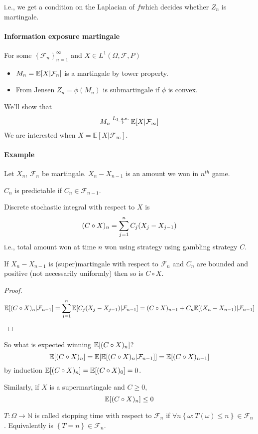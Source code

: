 i.e., we get a condition on the Laplacian of $f$which decides whether $Z_n$ is martingale.

\paragraph{Information exposure martingale}
For some $\left\{ \mathcal{F}_n \right\}_{n=1}^\infty$ and $X \in L^1(\Omega, \mathcal{F}, P)$
\begin{itemize}
	\item $M_n = \mathbb{E} \qty[X|\mathcal{F}_n]$ is a martingale by tower property.
	\item From Jensen $Z_n = \phi(M_n)$ is submartingale if $\phi$ is convex.
\end{itemize}

We'll show that
$$M_n \stackrel{L_1 \text{ a.s.}}{\to} \mathbb{E} \qty[X|\mathcal{F}_\infty]$$
We are interested when $X = \mathbb{E} [X|\mathcal{F}_\infty]$.
\paragraph{Example}
Let $X_n$, $\mathcal{F}_n$ be martingale. $X_n-X_{n-1}$ is an amount we won in $n^{th}$ game.

\begin{definition}
	$C_n$ is predictable if $C_n\in \mathcal{F}_{n-1}$.
\end{definition}
\begin{definition}
	Discrete stochastic integral with respect to $X$ is 
	$$(C \circ X)_n = \sum_{j=1}^n C_j\qty(X_j-X_{j-1})$$
	i.e., total amount won at time $n$ won using strategy using gambling strategy $C$.
\end{definition}

\begin{prop}
	If $X_n-X_{n-1}$ is (super)martingale with respect to $\mathcal{F}_n$ and $C_n$ are bounded and positive (not necessarily uniformly) then so is $C\circ X$.
	\begin{proof}
		$$\mathbb{E} [(C\circ X)_n|\mathcal{F}_{n-1}] = \sum_{j=1}^n \mathbb{E} \qty[C_j(X_j-X_{j-1}) | \mathcal{F}_{n-1}] = (C\circ X)_{n-1} + C_n\mathbb{E} \qty[(X_n-X_{n-1}) | \mathcal{F}_{n-1}] $$
	\end{proof}
\end{prop}

So what is expected winning $\mathbb{E}\qty[(C\circ X)_n]$?
$$\mathbb{E}\qty[(C\circ X)_n] = \mathbb{E}\qty[\mathbb{E}\qty[(C\circ X)_n|\mathcal{F}_{n-1}]]  =  \mathbb{E}\qty[(C\circ X)_{n-1}] $$
by induction $\mathbb{E}\qty[(C\circ X)_n] = \mathbb{E}\qty[(C\circ X)_0] = 0$.

Similarly, if $X$ is a supermartingale and $C\geq 0$,
$$\mathbb{E}\qty[(C\circ X)_n]\leq 0$$


\begin{definition}
$T: \Omega \to \mathbb{N}$ is called stopping time with respect to $\mathcal{F}_n$ if $\forall n \left\{ \omega: T(\omega) \leq n \right\} \in \mathcal{F}_n$. Equivalently is $\left\{ T=n\right\} \in \mathcal{F}_n$.
\end{definition}